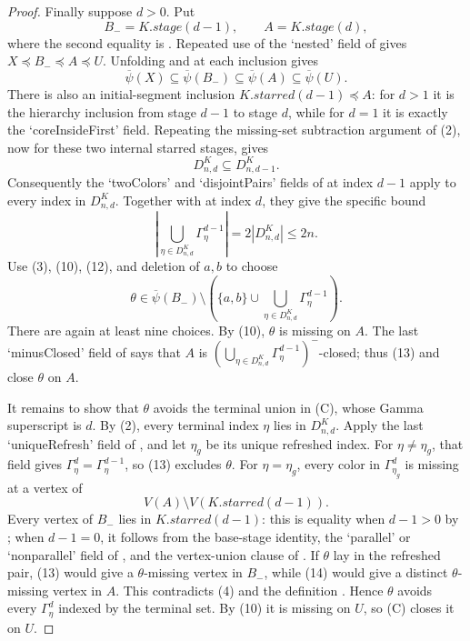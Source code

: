 \begin{proof}
Finally suppose $d>0$.  Put
\[
 B_-=K.\mathit{stage}(d-1),\qquad A=K.\mathit{stage}(d),
\]
where the second equality is .  Repeated
use of the `nested' field of  gives
$X\preccurlyeq B_-\preccurlyeq A\preccurlyeq U$.  Unfolding
 and
 at each inclusion gives
\[
 \overline\psi(X)\subseteq\overline\psi(B_-)
 \subseteq\overline\psi(A)\subseteq\overline\psi(U).         \tag{10}
\]
There is also an initial-segment inclusion
$K.\mathit{starred}(d-1)\preccurlyeq A$: for $d>1$ it is the hierarchy
inclusion from stage $d-1$ to stage $d$, while for $d=1$ it is exactly
the `coreInsideFirst' field.  Repeating the missing-set subtraction
argument of (2), now for these two internal starred stages, gives
\[
                         D^K_{n,d}\subseteq D^K_{n,d-1}.       \tag{11}
\]
Consequently the `twoColors' and `disjointPairs' fields of
 at index $d-1$ apply to every index in
$D^K_{n,d}$.  Together with
 at index $d$, they give the
specific bound
\[
 \left|\bigcup_{\eta\in D^K_{n,d}}\Gamma^{d-1}_\eta\right|
       =2|D^K_{n,d}|\leq2n.                                  \tag{12}
\]
Use (3), (10), (12), and deletion of $a,b$ to choose
\[
 \theta\in\overline\psi(B_-)
 \setminus\left(\{a,b\}\cup
   \bigcup_{\eta\in D^K_{n,d}}\Gamma^{d-1}_\eta\right).       \tag{13}
\]
There are again at least nine choices.  By (10), $\theta$ is missing on
$A$.  The last `minusClosed' field of  says that
$A$ is
$(\bigcup_{\eta\in D^K_{n,d}}\Gamma^{d-1}_\eta)^-$-closed;
thus (13) and  close $\theta$ on $A$.

It remains to show that $\theta$ avoids the terminal union in (C), whose
Gamma superscript is $d$.  By (2), every terminal index $\eta$ lies in
$D^K_{n,d}$.  Apply the last `uniqueRefresh' field of
, and let $\eta_g$ be its unique refreshed index.
For $\eta\ne\eta_g$, that field gives
$\Gamma^d_\eta=\Gamma^{d-1}_\eta$, so (13) excludes $\theta$.
For $\eta=\eta_g$, every color in $\Gamma^d_{\eta_g}$ is missing at a
vertex of
\[
             V(A)\setminus V(K.\mathit{starred}(d-1)).         \tag{14}
\]
Every vertex of $B_-$ lies in $K.\mathit{starred}(d-1)$: this is equality
when $d-1>0$ by ; when $d-1=0$, it follows
from the base-stage identity, the `parallel' or `nonparallel' field of
, and the vertex-union clause of
.  If $\theta$ lay in the refreshed pair,
(13) would give a $\theta$-missing vertex in $B_-$, while (14) would give
a distinct $\theta$-missing vertex in $A$.  This contradicts (4) and the
definition .  Hence $\theta$ avoids
every $\Gamma^d_\eta$ indexed by the terminal set.  By (10) it is missing
on $U$, so (C) closes it on $U$.


\end{proof}
